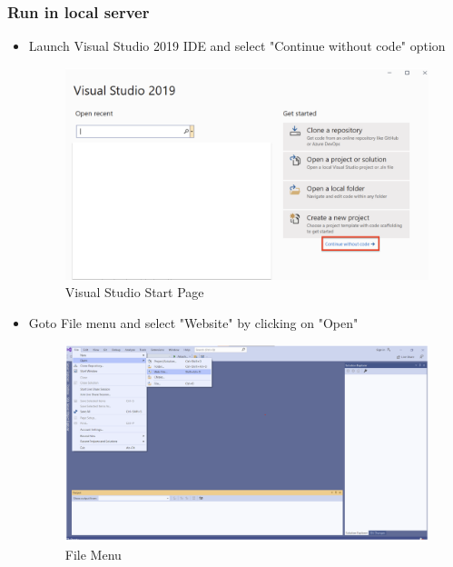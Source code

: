 \documentclass[10pt]{article}
\begin{document}
\subsubsection{Run in local server}
\begin{itemize}
    \item Launch Visual Studio 2019 IDE and select "Continue without code" option
    \begin{figure}[H]
    \begin{center}
        \includegraphics[width=0.7\linewidth, frame]{CA2-template/CM9.png}
       \caption{Visual Studio Start Page \label{fig:1}}
    \end{center}
\end{figure}

\item Goto File menu and select "Website" by clicking on "Open" 
\begin{figure}[H]
    \begin{center}
        \includegraphics[width=0.7\linewidth, frame]{CA2-template/CM10.png}
       \caption{File Menu \label{fig:2}}
    \end{center}
\end{figure}


\end{itemize}
\end{document}
